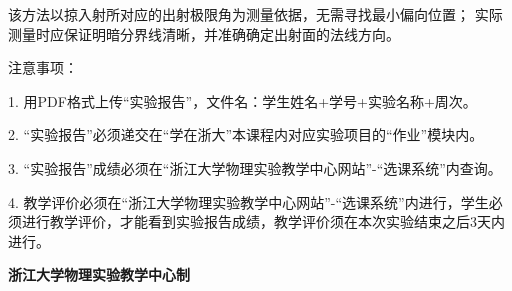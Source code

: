 \documentclass[10pt,a4paper]{ctexart} %
\begin{document}
    该方法以掠入射所对应的出射极限角为测量依据，无需寻找最小偏向位置；
    实际测量时应保证明暗分界线清晰，并准确确定出射面的法线方向。

\vspace*{\fill} %
\noindent
\begin{minipage}{\textwidth}
  注意事项：

  \begingroup
    \setlength{\leftskip}{2em} %
    1. 用PDF格式上传“实验报告”，文件名：学生姓名+学号+实验名称+周次。

    2. “实验报告”必须递交在“学在浙大”本课程内对应实验项目的“作业”模块内。

    3. “实验报告”成绩必须在“浙江大学物理实验教学中心网站”-“选课系统”内查询。

    4. 教学评价必须在“浙江大学物理实验教学中心网站”-“选课系统”内进行，学生必须进行教学评价，才能看到实验报告成绩，教学评价须在本次实验结束之后3天内进行。\par
  \endgroup

  \begin{center}
    {\bfseries 浙江大学物理实验教学中心制}
  \end{center}
\end{minipage}
\end{document}
